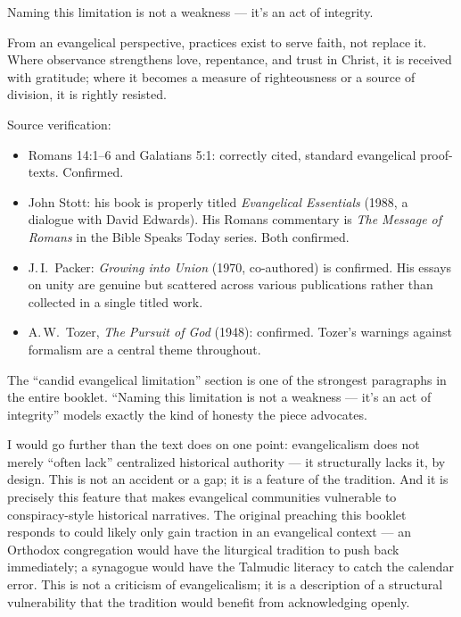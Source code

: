 \documentclass[10pt,twoside,openany]{book}
\begin{document}
Naming this limitation is not a weakness --- it's an act of integrity.

\bigskip

From an evangelical perspective, practices exist to serve faith, not
replace it. Where observance strengthens love, repentance, and trust in
Christ, it is received with gratitude; where it becomes a measure of
righteousness or a source of division, it is rightly resisted.

\begin{reviewerbox}
Source verification:
\begin{itemize}[leftmargin=1em,itemsep=2pt]
\item Romans 14:1--6 and Galatians 5:1: correctly cited, standard evangelical proof-texts. Confirmed.
\item John Stott: his book is properly titled \emph{Evangelical Essentials} (1988, a dialogue with David Edwards). His Romans commentary is \emph{The Message of Romans} in the Bible Speaks Today series. Both confirmed.
\item J.\,I.\ Packer: \emph{Growing into Union} (1970, co-authored) is confirmed. His essays on unity are genuine but scattered across various publications rather than collected in a single titled work.
\item A.\,W.\ Tozer, \emph{The Pursuit of God} (1948): confirmed. Tozer's warnings against formalism are a central theme throughout.
\end{itemize}

The ``candid evangelical limitation'' section is one of
the strongest paragraphs in the entire booklet.
``Naming this limitation is not a weakness --- it's an
act of integrity'' models exactly the kind of honesty
the piece advocates.

I would go further than the text does on one point:
evangelicalism does not merely ``often lack'' centralized
historical authority --- it structurally lacks it, by
design. This is not an accident or a gap; it is a
feature of the tradition. And it is precisely this
feature that makes evangelical communities vulnerable
to conspiracy-style historical narratives. The original
preaching this booklet responds to could likely only
gain traction in an evangelical context --- an Orthodox
congregation would have the liturgical tradition to
push back immediately; a synagogue would have the
Talmudic literacy to catch the calendar error. This
is not a criticism of evangelicalism; it is a
description of a structural vulnerability that the
tradition would benefit from acknowledging openly.
\end{reviewerbox}
\end{document}
